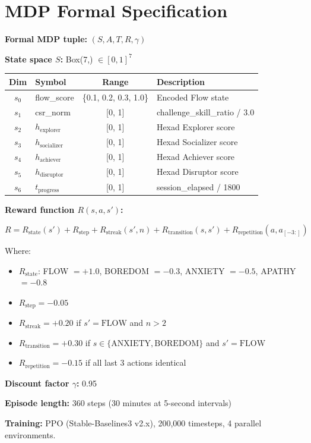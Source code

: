 \documentclass[12pt,a4paper]{report}
\begin{document}
\chapter{MDP Formal Specification}
\label{app:mdp}

\textbf{Formal MDP tuple:} $(S, A, T, R, \gamma)$

\textbf{State space $S$:} Box(7,) $\in [0, 1]^7$

\begin{table}[H]
\centering
\small
\begin{tabular}{@{}clcl@{}}
\toprule
\textbf{Dim} & \textbf{Symbol} & \textbf{Range} & \textbf{Description} \\
\midrule
$s_0$ & flow\_score & \{0.1, 0.2, 0.3, 1.0\} & Encoded Flow state \\
$s_1$ & csr\_norm & [0, 1] & challenge\_skill\_ratio / 3.0 \\
$s_2$ & $h_{\text{explorer}}$ & [0, 1] & Hexad Explorer score \\
$s_3$ & $h_{\text{socializer}}$ & [0, 1] & Hexad Socializer score \\
$s_4$ & $h_{\text{achiever}}$ & [0, 1] & Hexad Achiever score \\
$s_5$ & $h_{\text{disruptor}}$ & [0, 1] & Hexad Disruptor score \\
$s_6$ & $t_{\text{progress}}$ & [0, 1] & session\_elapsed / 1800 \\
\bottomrule
\end{tabular}
\end{table}

\textbf{Reward function $R(s, a, s')$:}

\[
R = R_{\text{state}}(s') + R_{\text{step}} + R_{\text{streak}}(s', n) + R_{\text{transition}}(s, s') + R_{\text{repetition}}(a, a_{[-3:]})
\]

Where:
\begin{itemize}
\item $R_{\text{state}}$: FLOW $= +1.0$, BOREDOM $= -0.3$, ANXIETY $= -0.5$, APATHY $= -0.8$
\item $R_{\text{step}} = -0.05$
\item $R_{\text{streak}} = +0.20$ if $s' = \text{FLOW}$ and $n > 2$
\item $R_{\text{transition}} = +0.30$ if $s \in \{\text{ANXIETY}, \text{BOREDOM}\}$ and $s' = \text{FLOW}$
\item $R_{\text{repetition}} = -0.15$ if all last 3 actions identical
\end{itemize}

\textbf{Discount factor $\gamma$:} 0.95

\textbf{Episode length:} 360 steps (30 minutes at 5-second intervals)

\textbf{Training:} PPO (Stable-Baselines3 v2.x), 200,000 timesteps, 4 parallel environments.
\end{document}
